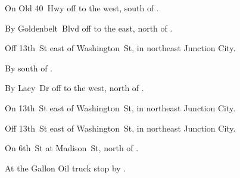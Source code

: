 

\begin{LocationList}

On Old 40~Hwy off  to the west, south of .

By Goldenbelt~Blvd off   to the east, north of .

Off 13th~St east of  Washington~St, in northeast Junction City.

By  south of .

By Lacy~Dr off   to the west, north of .

On 13th~St east of  Washington~St, in northeast Junction City.

Off 13th~St east of  Washington~St, in northeast Junction City.

On 6th~St at Madison~St, north of .

At the Gallon Oil truck stop by  .

\end{LocationList}
